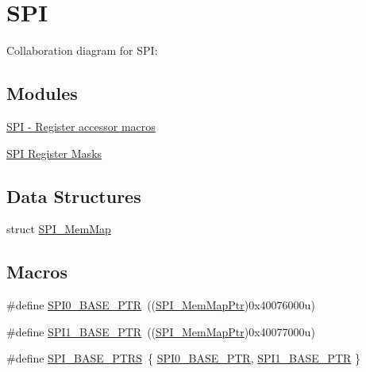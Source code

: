 \hypertarget{group___s_p_i___peripheral}{}\section{S\+PI}
\label{group___s_p_i___peripheral}
Collaboration diagram for S\+PI\+:
\subsection*{Modules}
\begin{DoxyCompactItemize}
\item 
\hyperlink{group___s_p_i___register___accessor___macros}{S\+P\+I -\/ Register accessor macros}
\item 
\hyperlink{group___s_p_i___register___masks}{S\+P\+I Register Masks}
\end{DoxyCompactItemize}
\subsection*{Data Structures}
\begin{DoxyCompactItemize}
\item 
struct \hyperlink{struct_s_p_i___mem_map}{S\+P\+I\+\_\+\+Mem\+Map}
\end{DoxyCompactItemize}
\subsection*{Macros}
\begin{DoxyCompactItemize}
\item 
\#define \hyperlink{group___s_p_i___peripheral_ga851f64a97b5919c1f99a34db5918b3b4}{S\+P\+I0\+\_\+\+B\+A\+S\+E\+\_\+\+P\+TR}~((\hyperlink{group___s_p_i___peripheral_ga7e4e9921e4d56bdbb10a04e77743ff5e}{S\+P\+I\+\_\+\+Mem\+Map\+Ptr})0x40076000u)
\item 
\#define \hyperlink{group___s_p_i___peripheral_gae28fd789e0602a32076c1c13ca39f5af}{S\+P\+I1\+\_\+\+B\+A\+S\+E\+\_\+\+P\+TR}~((\hyperlink{group___s_p_i___peripheral_ga7e4e9921e4d56bdbb10a04e77743ff5e}{S\+P\+I\+\_\+\+Mem\+Map\+Ptr})0x40077000u)
\item 
\#define \hyperlink{group___s_p_i___peripheral_ga3a16fecfe27c2052ab60e014be3f66f6}{S\+P\+I\+\_\+\+B\+A\+S\+E\+\_\+\+P\+T\+RS}~\{ \hyperlink{group___s_p_i___peripheral_ga851f64a97b5919c1f99a34db5918b3b4}{S\+P\+I0\+\_\+\+B\+A\+S\+E\+\_\+\+P\+TR}, \hyperlink{group___s_p_i___peripheral_gae28fd789e0602a32076c1c13ca39f5af}{S\+P\+I1\+\_\+\+B\+A\+S\+E\+\_\+\+P\+TR} \}
\end{DoxyCompactItemize}
